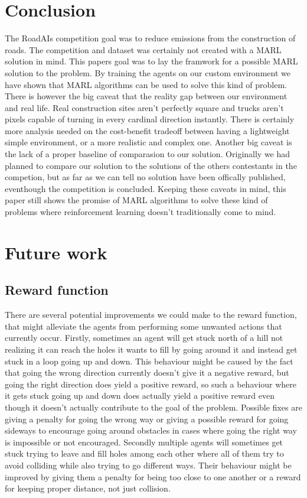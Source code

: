 \documentclass[conference]{IEEEtran}
\begin{document}
\section{Conclusion}
The RoadAIs competition goal was to reduce \coo{} emissions from the construction of roads.
The competition and dataset was certainly not created with a MARL solution in mind.
This papers goal was to lay the framwork for a possible MARL solution to the problem.
By training the agents on our custom environment we have shown that MARL algorithms can be used to solve this  kind of problem.
There is however the big caveat that the reality gap between our environment and real life.
Real construction sites aren't perfectly square and trucks aren't pixels capable of turning in every cardinal direction instantly. There is certainly more analysis needed on the cost-benefit tradeoff between having a lightweight simple environment, or a more realistic and complex one.
Another big caveat is the lack of a proper baseline of comparasion to our solution.
Originally we had planned to compare our solution to the solutions of the others contestants in the competion, but as far as we can tell no solution have been offically published, eventhough the competition is concluded.
Keeping these caveats in mind, this paper still shows the promise of MARL algorithms to solve these kind of
problems where reinforcement learning doesn't traditionally come to mind.



\section{Future work}
\subsection{Reward function}
There are several potential improvements we could make to the reward function, that might alleviate the agents from performing some unwanted actions that currently occur.
Firstly, sometimes an agent will get stuck north of a hill not realizing it can reach the holes it wants to fill by going around it and instead get stuck in a loop going up and down.
This behaviour might be caused by the fact that going the wrong direction currently doesn't give it a negative reward, but going the right direction does yield a positive reward, so such a behaviour where it gets stuck going up and down does actually yield a positive reward even though it doesn't actually contribute to the goal of the problem.
Possible fixes are giving a penalty for going the wrong way or giving a possible reward for going sideways to encourage going around obstacles in cases where going the right way is impossible or not encouraged.
Secondly multiple agents will sometimes get stuck trying to leave and fill holes among each other where all of them try to avoid colliding while also trying to go different ways.
Their behaviour might be improved by giving them a penalty for being too close to one another or a reward for keeping proper distance, not just collision.
\end{document}
